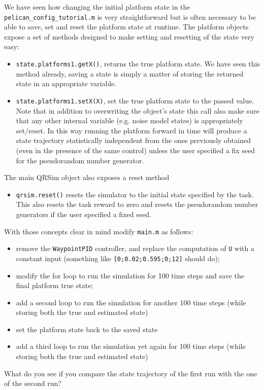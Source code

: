 \documentclass[a4paper,11pt]{article}
\begin{document}
We have seen how changing the initial platform state in the \texttt{pelican\_config\_tutorial.m} is very straightforward but is often necessary to be able to save, set and reset the platform state at runtime.
The platform objects expose a set of methods designed to make setting and resetting of the state very easy:
\begin{itemize}
\item \texttt{state.platforms{1}.getX()}, returns the true platform state. We have seen this method already, saving a state is simply a matter of storing the returned state in an appropriate variable.
\item \texttt{state.platforms{1}.setX(X)}, set the true platform state to the passed value. Note that in addition to overwriting the object's state this call also make sure that any other internal variable (e.g. noise model states) is appropriately set/reset. In this way running the platform forward in time will produce a state trajectory statistically independent from the ones previously obtained (even in the presence of the same control) unless the user specified a fix seed for the pseudorandom number generator.
\end{itemize}

The main QRSim object also exposes a reset method 
\begin{itemize}
\item \texttt{qrsim.reset()} resets the simulator to the initial state specified by the task. This also resets the task reward to zero and resets the pseudorandom number generators if the user specified a fixed seed. 
\end{itemize}

With those concepts clear in mind modify \texttt{main.m} as follows:
\begin{itemize}
\item remove the \texttt{WaypointPID} controller, and replace the computation of \texttt{U} with a constant input (something like \texttt{[0;0.02;0.595;0;12]} should do);
\item modify the for loop to run the simulation for 100 time steps and save the final platform true state;
\item add a second loop to run the simulation for another 100 time steps (while storing both the true and estimated state)
\item set the platform state back to the saved state
\item add a third loop to run the simulation yet again for 100 time steps (while storing both the true and estimated state)
\end{itemize}
What do you see if you compare the state trajectory of the first run with the one of the second run? 
\end{document}
